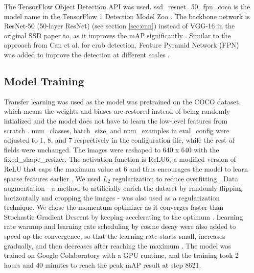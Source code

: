 \documentclass[a4paper, 11pt, oneside]{article}
\begin{document}
  The TensorFlow Object Detection API \cite{huang2017speed, tfobjectdetection} was used. ssd\_resnet\_50\_fpn\_coco
  is the model name in the TensorFlow 1 Detection Model Zoo \cite{tf1detectionmodelzoo}. The backbone network
  is ResNet-50 (50-layer ResNet) (see section \ref{sec:cnn}) instead of VGG-16 in the original SSD paper to, as it
  improves the mAP significantly \cite{he2016deep}. Similar to the approach from Can et al. \cite{cao2020real} for crab
  detection, Feature Pyramid Network (FPN) was added to improve the detection at different scales \cite{lin2017feature}.

  \subsection{Model Training}

  Transfer learning \cite{torrey2010transfer} was used as the model was pretrained on the COCO dataset, which means the
  weights and biases are restored instead of being randomly intialized and the model does not have to learn the low-level
  features from scratch \cite{geron2019hands}. num\_classes, batch\_size, and num\_examples in eval\_config were adjusted
  to 1, 8, and 7 respectively in the configuration file, while the rest of fields were unchanged. The images were reshaped
  to 640 x 640 with the fixed\_shape\_resizer. The activation function is ReLU6, a modified version of ReLU that caps
  the maximum value at 6 and thus encourages the model to learn sparse features earlier
  \cite{krizhevsky2010convolutional}. We used $L_2$ regularization \cite{ng2004feature} to reduce overfitting
  \cite{hawkins2004problem}. Data augmentation \cite{krizhevsky2012imagenet} - a method to artificially enrich the
  dataset by randomly flipping horizontally and cropping the images - was also used as a regularization technique.
  We chose the momentum optimizer \cite{polyak1964some} as it converges faster than Stochastic Gradient Descent
  \cite{bottou2010large} by keeping accelerating to the optimum \cite{geron2019hands}. Learning rate warmup and learning
  rate scheduling by cosine decay were also added to speed up the convergence, so that the learning rate starts small,
  increases gradually, and then decreases after reaching the maximum
  \cite{geron2019hands, goyal2017accurate, senior2013empirical, loshchilov2016sgdr}.
  The model was trained on Google Colaboratory \cite{colab} with a GPU runtime, and the training took 2 hours and 40
  minutes to reach the peak mAP result at step 8621.
\end{document}
